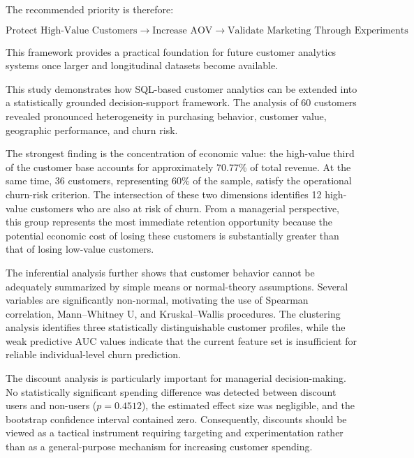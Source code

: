 \documentclass[11pt,a4paper]{article}
\begin{document}
The recommended priority is therefore:

\[
\boxed{
\text{Protect High-Value Customers}
\rightarrow
\text{Increase AOV}
\rightarrow
\text{Validate Marketing Through Experiments}
}
\]

This framework provides a practical foundation for future customer analytics systems once larger and longitudinal datasets become available.


This study demonstrates how SQL-based customer analytics can be extended
into a statistically grounded decision-support framework. The analysis
of 60 customers revealed pronounced heterogeneity in purchasing behavior,
customer value, geographic performance, and churn risk.

The strongest finding is the concentration of economic value: the
high-value third of the customer base accounts for approximately 70.77\%
of total revenue. At the same time, 36 customers, representing 60\% of
the sample, satisfy the operational churn-risk criterion. The intersection
of these two dimensions identifies 12 high-value customers who are also
at risk of churn. From a managerial perspective, this group represents
the most immediate retention opportunity because the potential economic
cost of losing these customers is substantially greater than that of
losing low-value customers.

The inferential analysis further shows that customer behavior cannot be
adequately summarized by simple means or normal-theory assumptions.
Several variables are significantly non-normal, motivating the use of
Spearman correlation, Mann--Whitney U, and Kruskal--Wallis procedures.
The clustering analysis identifies three statistically distinguishable
customer profiles, while the weak predictive AUC values indicate that
the current feature set is insufficient for reliable individual-level
churn prediction.

The discount analysis is particularly important for managerial
decision-making. No statistically significant spending difference was
detected between discount users and non-users ($p=0.4512$), the estimated
effect size was negligible, and the bootstrap confidence interval
contained zero. Consequently, discounts should be viewed as a tactical
instrument requiring targeting and experimentation rather than as a
general-purpose mechanism for increasing customer spending.
\end{document}
